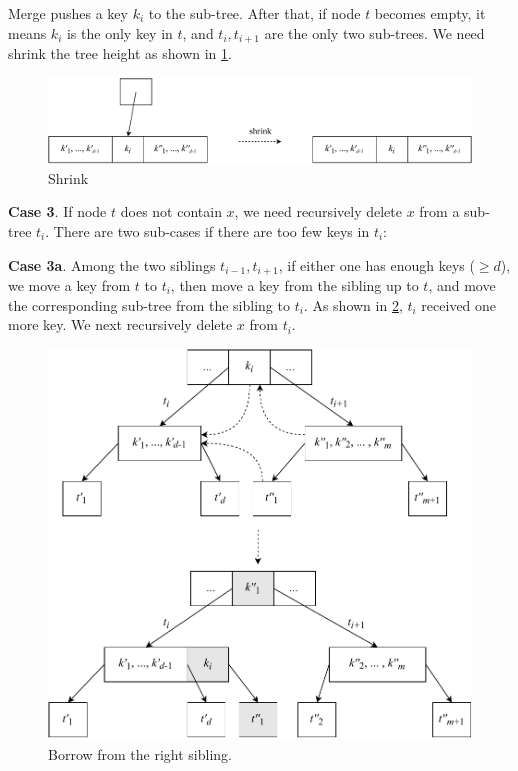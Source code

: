 \documentclass[b5paper]{article}
\begin{document}
Merge pushes a key $k_i$ to the sub-tree. After that, if node $t$ becomes empty, it means $k_i$ is the only key in $t$, and $t_i, t_{i+1}$ are the only two sub-trees. We need shrink the tree height as shown in \cref{fig:btree-del-shrink}.

\begin{figure}[htbp]
  \centering
  \includegraphics[scale=0.65]{img/btree-del-shrink}
  \caption{Shrink}
  \label{fig:btree-del-shrink}
\end{figure}

\textbf{Case 3}. If node $t$ does not contain $x$, we need recursively delete $x$ from a sub-tree $t_i$. There are two sub-cases if there are too few keys in $t_i$:

\textbf{Case 3a}. Among the two siblings $t_{i-1}, t_{i+1}$, if either one has enough keys ($\geq d$), we move a key from $t$ to $t_i$, then move a key from the sibling up to $t$, and move the corresponding sub-tree from the sibling to $t_i$. As shown in \cref{fig:btree-del-borrow}, $t_i$ received one more key. We next recursively delete $x$ from $t_i$.

\begin{figure}[htbp]
  \centering
  \includegraphics[scale=0.65]{img/btree-del-borrow}
  \caption{Borrow from the right sibling.}
  \label{fig:btree-del-borrow}
\end{figure}
\end{document}
